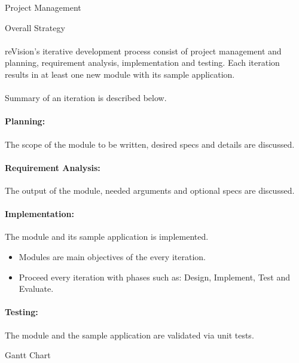 \documentclass[12pt, a4paper]{article} \pagenumbering{gobble}
\begin{document}
\newpage

\begin{section}{Project Management}
  \begin{subsection}{Overall Strategy}
    \paragraph{}{reVision's iterative development process consist of project management and planning, requirement analysis, implementation and testing. Each iteration results in at least one new module with its sample application.}\\ \\
    Summary of an iteration is described below.
    \paragraph{Planning:}{The scope of the module to be written, desired specs and details are discussed.}
    \paragraph{Requirement Analysis:}{The output of the module, needed arguments and optional specs are discussed.}
    \paragraph{Implementation:}{The module and its sample application is implemented.
    \begin{itemize}
      \item Modules are main objectives of the every iteration.
      \item Proceed every iteration with phases such as: Design, Implement, Test and Evaluate.
    \end{itemize}}
    \paragraph{Testing:}{The module and the sample application are validated via unit tests.}
  \end{subsection}

  \newpage

  \begin{subsection}{Gantt Chart}
  \vspace*{\fill}
  \begin{centering}
\end{centering}
\end{subsection}
\end{section}
\end{document}
